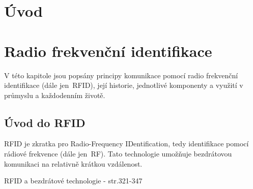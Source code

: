 
\chapter{Úvod}
\label{uvod}


\chapter{Radio frekvenční identifikace}
\label{technologie_rfid}
V této kapitole jsou popsány principy komunikace pomocí radio frekvenční identifikace (dále jen~RFID), její historie, jednotlivé komponenty a využití v průmyslu a každodenním životě.

\section{Úvod do RFID}
RFID je zkratka pro {Radio-Frequency IDentification}, tedy identifikace pomocí rádiové frekvence (dále jen~RF). Tato technologie umožňuje bezdrátovou komunikaci na relativně krátkou vzdálenost\cite{The_RF_in_RFID}.
\par
RFID a bezdrátové technologie \cite{Smart_Cards_Tokens_Security}{ - str.321-347}

